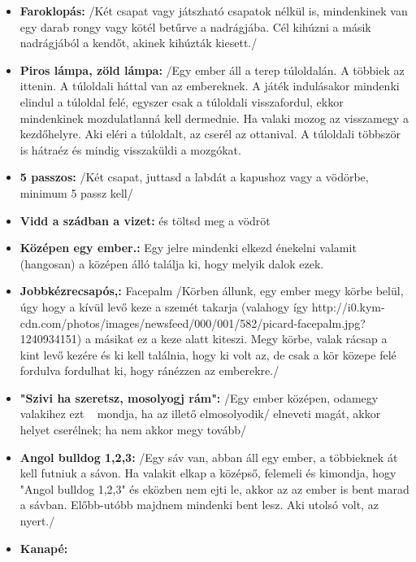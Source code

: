 \documentclass[a4paper, 12pt, twoside, openright]{article}
\begin{document}
\begin{itemize}
\item \textbf{Faroklopás:} /Két csapat vagy játszható csapatok nélkül is, mindenkinek van egy darab rongy vagy kötél betűrve a nadrágjába. Cél kihúzni a másik nadrágjából a kendőt, akinek kihúzták kiesett./

\item \textbf{Piros lámpa, zöld lámpa:} /Egy ember áll a terep túloldalán. A többiek az ittenin. A túloldali háttal van az embereknek. A játék indulásakor mindenki elindul a túloldal felé, egyszer csak a túloldali visszafordul, ekkor mindenkinek mozdulatlanná kell dermednie. Ha valaki mozog az visszamegy a kezdőhelyre. Aki eléri a túloldalt, az cserél az ottanival. A túloldali többször is hátraéz és mindig visszaküldi a mozgókat.

\item \textbf{5 passzos:} /Két csapat, juttasd a labdát a kapushoz vagy a vödörbe, minimum 5 passz kell/

\item \textbf{Vidd a szádban a vizet:} és töltsd meg a vödröt

\item \textbf{Középen egy ember.:} Egy jelre mindenki elkezd énekelni valamit (hangosan) a középen álló találja ki, hogy melyik dalok ezek.

\item \textbf{Jobbkézrecsapós,:} Facepalm /Körben állunk, egy ember megy körbe belül, úgy hogy a kívül levő keze a szemét takarja (valahogy így http://i0.kym-cdn.com/photos/images/newsfeed/000/001/582/picard-facepalm.jpg?1240934151) a másikat ez a keze alatt kiteszi. Megy körbe, valak rácsap a kint levő kezére és ki kell találnia, hogy ki volt az, de csak a kör közepe felé fordulva fordulhat ki, hogy ránézzen az emberekre./

\item \textbf{"Szivi ha szeretsz, mosolyogj rám":} /Egy ember középen, odamegy valakihez ezt ~ mondja, ha az illető elmosolyodik/ elneveti magát, akkor helyet cserélnek; ha nem akkor megy tovább/

\item \textbf{Angol bulldog 1,2,3:} /Egy sáv van, abban áll egy ember, a többieknek át kell futniuk a sávon. Ha valakit elkap a középső, felemeli és kimondja, hogy "Angol bulldog 1,2,3" és eközben nem ejti le, akkor az az ember is bent marad a sávban. Előbb-utóbb majdnem mindenki bent lesz. Aki utolsó volt, az nyert./

\item \textbf{Kanapé:}


\end{itemize}
\end{document}
